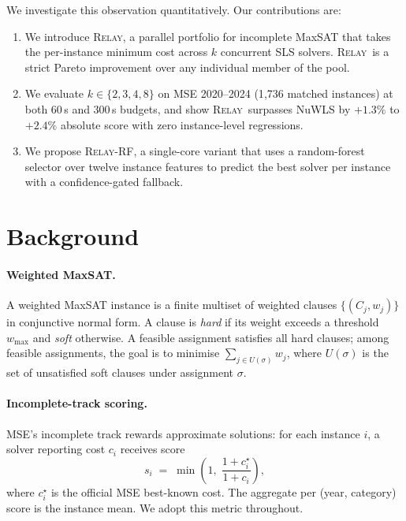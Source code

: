 \documentclass[11pt,letterpaper]{article}
\newcommand{\RELAY}{\textsc{Relay}}
\begin{document}
We investigate this observation quantitatively.  Our contributions are:

\begin{enumerate}
    \item We introduce \RELAY, a parallel portfolio for incomplete MaxSAT that takes the per-instance minimum cost across $k$ concurrent SLS solvers.  \RELAY\ is a strict Pareto improvement over any individual member of the pool.
    \item We evaluate $k\in\{2,3,4,8\}$ on MSE 2020--2024 (1{,}736 matched instances) at both 60\,s and 300\,s budgets, and show \RELAY\ surpasses NuWLS by $+1.3\%$ to $+2.4\%$ absolute score with zero instance-level regressions.
    \item We propose \RELAY-RF, a single-core variant that uses a random-forest selector over twelve instance features to predict the best solver per instance with a confidence-gated fallback.
\end{enumerate}

\section{Background}

\paragraph{Weighted MaxSAT.}  A weighted MaxSAT instance is a finite multiset of weighted clauses $\{(C_j,w_j)\}$ in conjunctive normal form.  A clause is \emph{hard} if its weight exceeds a threshold $w_{\max}$ and \emph{soft} otherwise.  A feasible assignment satisfies all hard clauses; among feasible assignments, the goal is to minimise $\sum_{j\in U(\sigma)} w_j$, where $U(\sigma)$ is the set of unsatisfied soft clauses under assignment $\sigma$.

\paragraph{Incomplete-track scoring.}  MSE's incomplete track rewards approximate solutions: for each instance $i$, a solver reporting cost $c_i$ receives score
\[
    s_i \;=\; \min\!\left(1,\; \frac{1+c_i^{\star}}{1+c_i}\right),
\]
where $c_i^{\star}$ is the official MSE best-known cost.  The aggregate per (year, category) score is the instance mean.  We adopt this metric throughout.
\end{document}
